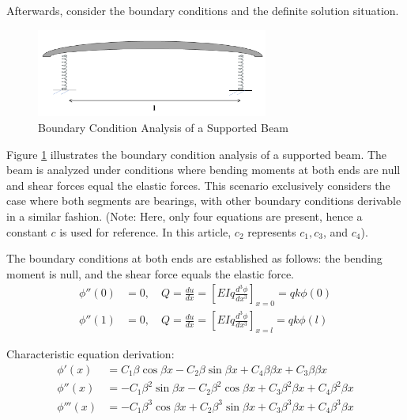 \documentclass[conference]{IEEEtran}
\begin{document}
Afterwards, consider the boundary conditions and the definite solution situation. 
\begin{figure}[ht!] %
\centering
\includegraphics[width=3.0in]{2.png}
\caption{Boundary Condition Analysis of a Supported Beam}
\label{2}
\end{figure}
Figure \ref{2} illustrates the boundary condition analysis of a supported beam. The beam is analyzed under conditions where bending moments at both ends are null and shear forces equal the elastic forces. This scenario exclusively considers the case where both segments are bearings, with other boundary conditions derivable in a similar fashion. (Note: Here, only four equations are present, hence a constant \( c \) is used for reference. In this article, \( c_2 \) represents \( c_1, c_3 \), and \( c_4 \)).

The boundary conditions at both ends are established as follows: the bending moment is null, and the shear force equals the elastic force.
\begin{equation}
\begin{aligned}
\phi''(0) &= 0, \quad Q = \frac{du}{dx}= \left[ EI q\frac{d^3 \phi}{dx^3} \right]_{x=0} = qk\phi{}(0) \\
\phi''(1) &= 0, \quad Q = \frac{du}{dx}= \left[ EI q\frac{d^3 \phi}{dx^3} \right]_{x=l} = qk\phi{}(l)
\end{aligned}
\end{equation}

Characteristic equation derivation:
\begin{equation}
\begin{aligned}
\phi'(x) &= C_1\beta \cos \beta x - C_2\beta \sin \beta x + C_4\beta \beta x + C_3\beta \beta x \\
\phi''(x) &= -C_1 \beta^2 \sin \beta x - C_2 \beta^2 \cos \beta x + C_3 \beta^2\beta{}x + C_4 \beta^2\beta{}x \\
\phi'''(x) &= -C_1 \beta^3 \cos \beta x + C_2 \beta^3 \sin \beta x + C_3 \beta^3\beta{}x + C_4 \beta^3\beta{}x
\end{aligned}
\end{equation}
\end{document}
